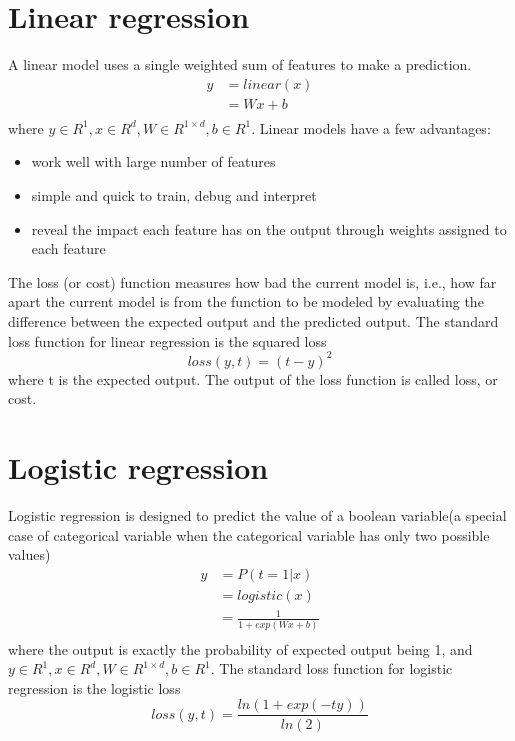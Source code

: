 \documentclass[12pt]{WSUThesis}
\theoremstyle{definition}
\begin{document}
\section{Linear regression}
A linear model uses a single weighted sum of features to make a prediction.
\begin{align*}
	y
	&= linear(x) \\
	&= Wx + b \\
\end{align*}
where $ y \in R^1, x \in R^d, W \in R^{1 \times d}, b \in R^1 $.
Linear models have a few advantages:
\begin{itemize}
	\item work well with large number of features
	\item simple and quick to train, debug and interpret
	\item reveal the impact each feature has on the output through weights assigned to each feature
\end{itemize}
The loss (or cost) function measures how bad the current model is, i.e., how far apart the current model is from the function to be modeled by evaluating the difference between the expected output and the predicted output.
The standard loss function for linear regression is the squared loss
\[loss(y, t) = (t - y)^2 \]
where t is the expected output.
The output of the loss function is called loss, or cost.

\section{Logistic regression}
Logistic regression is designed to predict the value of a boolean variable(a special case of categorical variable when the categorical variable has only two possible values)
\begin{align*}
	y
	&= P(t = 1 | x) \\
	&= logistic(x) \\
	&= \frac{1}{1 + exp(Wx+b)}\\
\end{align*}
where the output is exactly the probability of expected output being 1, and $ y \in R^1, x \in R^d, W \in R^{1 \times d}, b \in R^1 $.
The standard loss function for logistic regression is the logistic loss
\[ loss(y, t) = \frac{ln(1 + exp(-ty))}{ln(2)} \]
\end{document}
